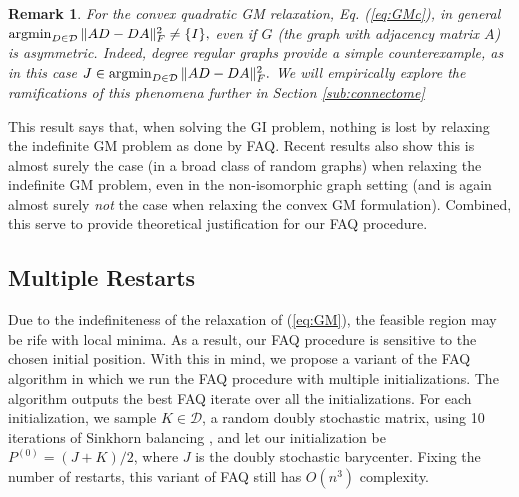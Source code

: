 \documentclass[10pt]{article}
\providecommand{\mc}[1]{\mathcal{#1}}
\providecommand{\mc}[1]{\mathcal{#1}}
\newcommand{\T}{^{\ensuremath{\mathsf{T}}}}
\newcommand{\argmin}{\operatornamewithlimits{argmin}}
\providecommand{\norm}[1]{\left \lVert#1 \right  \rVert}
\newtheorem{rem}{Remark}
\begin{document}
\begin{rem}
\emph{ For the convex quadratic GM relaxation, Eq. (\ref{eq:GMc}),
in general } 
$\argmin_{D\in\mc{D}} \|AD-DA\|^2_F\neq\{I\},$
\emph{even if $G$ (the graph with adjacency matrix $A$) is asymmetric.  Indeed, degree regular graphs provide a simple counterexample, as in this case} 
$J\in\argmin_{D\in\mc{D}} \|AD-DA\|^2_F.$
\emph{We will empirically explore the ramifications of this phenomena further in Section \ref{sub:connectome}}
\end{rem}

This result says that, when solving the GI problem, nothing is lost by relaxing the indefinite GM problem as done by FAQ.  Recent results also show this is almost surely the case (in a broad class of random graphs) when relaxing the indefinite GM problem, even in the non-isomorphic graph setting \cite{lyzinski2014graph} (and is again almost surely {\it not} the case when relaxing the convex GM formulation).  Combined, this serve to provide theoretical justification for our FAQ procedure. 

\subsection{Multiple Restarts} 
\label{sub:multiple_restarts}

Due to the indefiniteness of the relaxation of (\ref{eq:GM}), the feasible region may be rife with local minima.  
As a result, our FAQ procedure is sensitive to the chosen initial position.    
With this in mind, we propose a variant of the FAQ algorithm in which we run the FAQ procedure with
multiple initializations.  The algorithm outputs the best FAQ iterate over all the initializations.
For each initialization, we  sample $K \in \mc{D}$, a random doubly stochastic matrix, using 10 iterations of Sinkhorn balancing \cite{Sinkhorn1964}, and let our initialization be $P^{(0)}=(J+K)/2$, where $J$ is the doubly stochastic barycenter.  Fixing the number of restarts, this variant of FAQ still has $O(n^3)$ complexity.    
\end{document}
